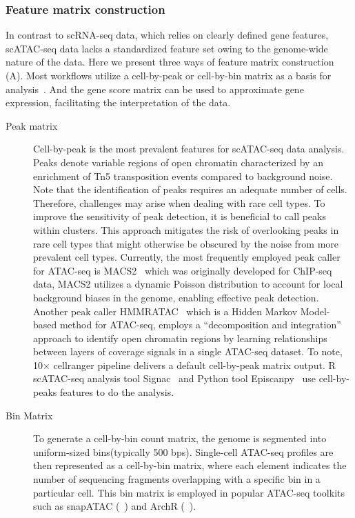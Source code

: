 \subsubsection{Feature matrix construction}
\label{background:sec2:scATAC:matrixconstruction}
In contrast to scRNA-seq data, which relies on clearly defined gene features, scATAC-seq data lacks a standardized feature set owing to the genome-wide nature of the data. Here we present three ways of feature matrix construction (A). Most workflows utilize a cell-by-peak or cell-by-bin matrix as a basis for analysis~\citep{heumos2023best}. And the gene score matrix can be used to approximate gene expression, facilitating the interpretation of the data.
\begin{description}
	\item[Peak matrix]
	Cell-by-peak is the most prevalent features for scATAC-seq data analysis. Peaks denote variable regions of open chromatin characterized by an enrichment of Tn5 transposition events compared to background noise. Note that the identification of peaks requires an adequate number of cells. Therefore, challenges may arise when dealing with rare cell types. To improve the sensitivity of peak detection, it is beneficial to call peaks within clusters. This approach mitigates the risk of overlooking peaks in rare cell types that might otherwise be obscured by the noise from more prevalent cell types. Currently, the most frequently employed peak caller for ATAC-seq is MACS2~\citep{zhang2008macs2} which was originally developed for ChIP-seq data, MACS2 utilizes a dynamic Poisson distribution to account for local background biases in the genome, enabling effective peak detection. Another peak caller HMMRATAC~\citep{tarbell2019hmmratac} which is a Hidden Markov Model-based method for ATAC-seq, employs a ``decomposition and integration'' approach to identify open chromatin regions by learning relationships between layers of coverage signals in a single ATAC-seq dataset.  To note, 10$\times$ cellranger pipeline delivers a default cell-by-peak matrix output. R scATAC-seq analysis tool Signac~\citep{signac} and Python tool Episcanpy~\citep{Danese2021episcanpy} use cell-by-peaks features to do the analysis.

	\item[Bin Matrix]
	To generate a cell-by-bin count matrix, the genome is segmented into uniform-sized bins(typically 500 bps). Single-cell ATAC-seq profiles are then represented as a cell-by-bin matrix, where each element indicates the number of sequencing fragments overlapping with a specific bin in a particular cell. This bin matrix is employed in popular ATAC-seq toolkits such as snapATAC (~\citep{fang2021snapatac}) and ArchR (~\citep{Granja2021}).


\end{description}
